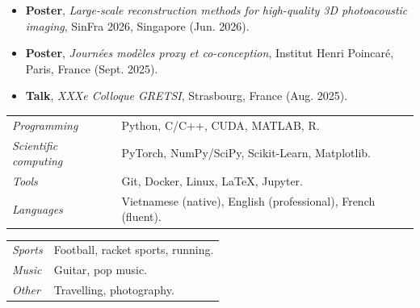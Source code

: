 \documentclass[a4paper,10pt]{article}
\begin{document}
\medskip
{}
\begin{itemize}[leftmargin=*]
    \item \textbf{Poster}, \emph{Large-scale reconstruction methods for high-quality 3D photoacoustic imaging}, SinFra 2026, Singapore (Jun. 2026).
    \item \textbf{Poster}, \emph{Journées modèles proxy et co-conception}, Institut Henri Poincaré, Paris, France (Sept. 2025).
    \item \textbf{Talk}, \emph{XXXe Colloque GRETSI}, Strasbourg, France (Aug. 2025).
\end{itemize}


\bigskip
\begin{tabular}{p{4cm}p{12cm}}
    \emph{Programming} & Python, C/C++, CUDA, MATLAB, R. \\
    \emph{Scientific computing} & PyTorch, NumPy/SciPy, Scikit-Learn, Matplotlib. \\
    \emph{Tools} & Git, Docker, Linux, \LaTeX, Jupyter. \\
    \emph{Languages} & Vietnamese (native), English (professional), French (fluent). \\
\end{tabular}

\bigskip
\noindent
\begin{tabular}{p{3cm}p{15cm}}
    \emph{Sports} & Football, racket sports, running. \\
    \emph{Music}  & Guitar, pop music. \\
    \emph{Other}  & Travelling, photography.
\end{tabular}
\end{document}
